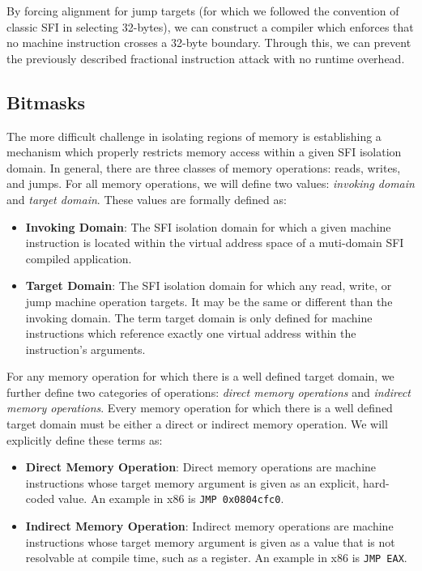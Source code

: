 \documentclass[12pt]{article}
\begin{document}
By forcing alignment for jump targets (for which we followed the convention of classic SFI in selecting 32-bytes), we can construct a compiler which enforces that no machine instruction crosses a 32-byte boundary. Through this, we can prevent the previously described fractional instruction attack with no runtime overhead.

\subsection{Bitmasks} \label{bitmasks}

The more difficult challenge in isolating regions of memory is establishing a mechanism which properly restricts memory access within a given SFI isolation domain. In general, there are three classes of memory operations: reads, writes, and jumps. For all memory operations, we will define two values: \textit{invoking domain} and \textit{target domain}. These values are formally defined as:

\begin{itemize}
\item \textbf{Invoking Domain}: The SFI isolation domain for which a given machine instruction is located within the virtual address space of a muti-domain SFI compiled application.
\item \textbf{Target Domain}: The SFI isolation domain for which any read, write, or jump machine operation targets. It may be the same or different than the invoking domain. The term target domain is only defined for machine instructions which reference exactly one virtual address within the instruction's arguments.
\end{itemize}

For any memory operation for which there is a well defined target domain, we further define two categories of operations: \textit{direct memory operations} and \textit{indirect memory operations}. Every memory operation for which there is a well defined target domain must be either a direct or indirect memory operation. We will explicitly define these terms as:

\begin{itemize}
\item \textbf{Direct Memory Operation}: Direct memory operations are machine instructions whose target memory argument is given as an explicit, hard-coded value. An example in x86 is \texttt{JMP 0x0804cfc0}.
\item \textbf{Indirect Memory Operation}: Indirect memory operations are machine instructions whose target memory argument is given as a value that is not resolvable at compile time, such as a register. An example in x86 is \texttt{JMP EAX}.
\end{itemize}
\end{document}
